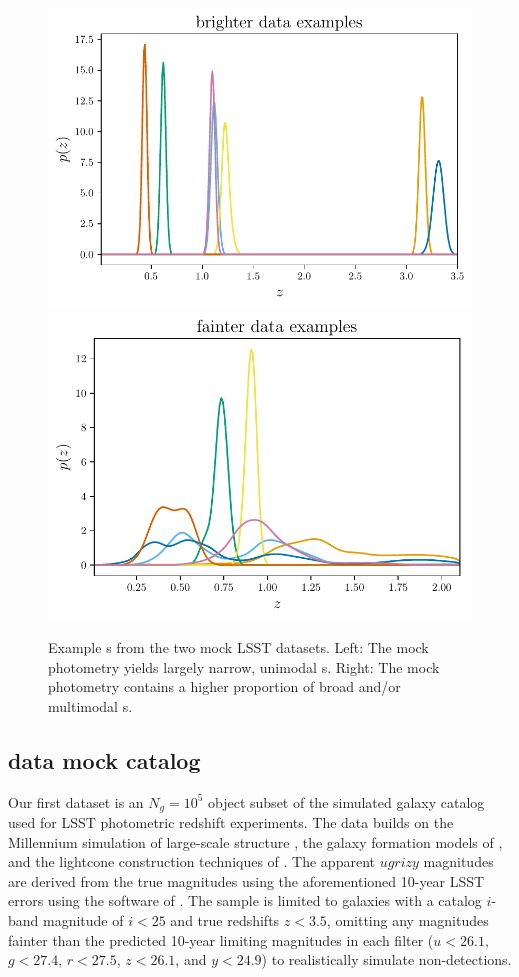 \begin{figure}
	\begin{center}
		\includegraphics[width=0.5\columnwidth]{figures/qp/graham_pzs.pdf}
		\includegraphics[width=0.5\columnwidth]{figures/qp/schmidt_pzs.pdf}
		\caption{
			Example \pz s from the two mock LSST datasets.
			Left: The \mgdata mock photometry yields largely narrow, unimodal \pz s.
			Right: The \ssdata mock photometry contains a higher proportion of broad 
			and/or multimodal \pz s.
			}
	\end{center}
\end{figure}

\subsection{\Mgdata data mock catalog}

Our first dataset is an $N_{g} = 10^{5}$ object subset of the 
\citet{graham_photometric_2017} simulated galaxy catalog used for LSST 
photometric redshift experiments.
The data builds on the Millennium simulation of large-scale structure 
\citep{springel_simulations_2005}, the galaxy formation models of 
\citet{gonzalez-perez_how_2014}, and the lightcone construction techniques of 
\citet{merson_lightcone_2013}.
The apparent $ugrizy$ magnitudes are derived from the true magnitudes using the 
aforementioned 10-year LSST errors using the software of 
\citet{connolly_end--end_2014}.
The sample is limited to galaxies with a catalog $i$-band magnitude of $i<25$ 
and true redshifts $z<3.5$, omitting any magnitudes fainter than the predicted 
10-year limiting magnitudes in each filter ($u<26.1$, $g<27.4$, $r<27.5$, 
$z<26.1$, and $y<24.9$) to realistically simulate non-detections.

